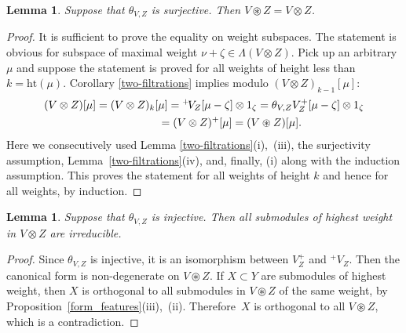 \documentclass[11pt]{article}
\numberwithin{equation}{section}
\newtheorem{Lemma}[Theorem]{Lemma}
\begin{document}
\begin{Lemma}\label{ext-tw-decomp}Suppose that $\theta_{V,Z}$ is surjective. Then $V\circledast Z=V\otimes Z$.
\end{Lemma}
\begin{proof} It is sufficient to prove the equality on weight subspaces. The statement is obvious for subspace of maximal weight $\nu+\zeta\in \Lambda(V\otimes Z)$. Pick up an arbitrary $\mu$ and suppose the statement is proved for all weights of height less than $k=\mathrm{ht}(\mu)$. Corollary \ref{two-filtrations} implies modulo $(V\otimes Z)_{k-1}[\mu]$:
\begin{gather*}
(V\otimes Z)[\mu]=(V\otimes Z)_k[\mu]={}^+\!V_Z[\mu-\zeta]\otimes 1_\zeta=\theta_{V,Z}V^+_Z[\mu-\zeta]\otimes 1_\zeta\\
\hphantom{(V\otimes Z)[\mu]}{} =(V\otimes Z)^+[\mu] =(V\circledast Z)[\mu].
\end{gather*}
Here we consecutively used Lemma \ref{two-filtrations}(i),~(iii), the surjectivity assumption, Lemma~\ref{two-filtrations}(iv), and, finally, (i) along with the induction assumption. This proves the statement for all weights of height $k$ and hence for all weights, by induction.
\end{proof}

\begin{Lemma}\label{irred} Suppose that $\theta_{V,Z} $ is injective. Then all submodules of highest weight in $V\otimes Z$ are irreducible.
\end{Lemma}
\begin{proof}Since $\theta_{V,Z} $ is injective, it is an isomorphism between $V^+_Z$ and ${}^+\!V_Z$. Then the canonical form is non-degenerate on $V\circledast Z$. If $X\subset Y$ are submodules of highest weight, then $X$ is orthogonal to all submodules in $V\circledast Z$ of the same weight, by Proposition~\ref{form_features}(iii),~(ii). Therefore~$X$ is orthogonal to all $V\circledast Z$, which is a contradiction.
\end{proof}
\end{document}
